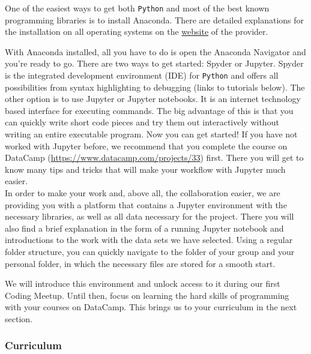 \documentclass[
  11pt,
]{article}
\begin{document}
One of the easiest ways to get both \texttt{Python} and most of the best known programming libraries is to install Anaconda. There are detailed explanations for the installation on all operating systems on the \href{https://docs.anaconda.com/anaconda/install/}{website} of the provider.

With Anaconda installed, all you have to do is open the Anaconda Navigator and you're ready to go. There are two ways to get started: Spyder or Jupyter. Spyder is the integrated development environment (IDE) for \texttt{Python} and offers all possibilities from syntax highlighting to debugging (links to tutorials below). The other option is to use Jupyter or Jupyter notebooks. It is an internet technology based interface for executing commands. The big advantage of this is that you can quickly write short code pieces and try them out interactively without writing an entire executable program.
Now you can get started! If you have not worked with Jupyter before, we recommend that you complete the course on DataCamp (\url{https://www.datacamp.com/projects/33}) first. There you will get to know many tips and tricks that will make your workflow with Jupyter much easier.\\
In order to make your work and, above all, the collaboration easier, we are providing you with a platform that contains a Jupyter environment with the necessary libraries, as well as all data necessary for the project. There you will also find a brief explanation in the form of a running Jupyter notebook and introductions to the work with the data sets we have selected. Using a regular folder structure, you can quickly navigate to the folder of your group and your personal folder, in which the necessary files are stored for a smooth start.

We will introduce this environment and unlock access to it during our first Coding Meetup. Until then, focus on learning the hard skills of programming with your courses on DataCamp. This brings us to your curriculum in the next section.

\hypertarget{curriculum-1}{%
\subsubsection{Curriculum}\label{curriculum-1}}
\end{document}
